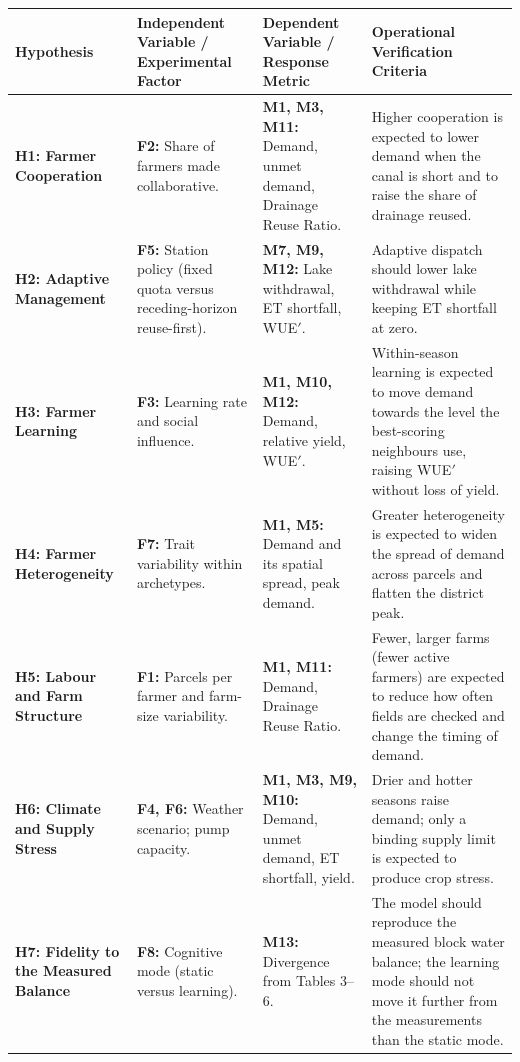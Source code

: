 \documentclass{article}
\begin{document}
\begin{changed}
\medskip
\centering
\small
{}
\begin{tabular}{|p{2.2cm}|p{4.3cm}|p{4.6cm}|p{6.2cm}|}
    \hline
    \rowcolor[HTML]{F8F319}
    \textbf{Hypothesis} & \textbf{Independent Variable / Experimental Factor} & \textbf{Dependent Variable / Response Metric} & \textbf{Operational Verification Criteria} \\ \hline
    \textbf{H1: Farmer Cooperation} & \textbf{F2:} Share of farmers made collaborative. & \textbf{M1, M3, M11:} Demand, unmet demand, Drainage Reuse Ratio. & Higher cooperation is expected to lower demand when the canal is short and to raise the share of drainage reused. \\ \hline
    \textbf{H2: Adaptive Management} & \textbf{F5:} Station policy (fixed quota versus receding-horizon reuse-first). & \textbf{M7, M9, M12:} Lake withdrawal, ET shortfall, WUE$'$. & Adaptive dispatch should lower lake withdrawal while keeping ET shortfall at zero. \\ \hline
    \textbf{H3: Farmer Learning} & \textbf{F3:} Learning rate and social influence. & \textbf{M1, M10, M12:} Demand, relative yield, WUE$'$. & Within-season learning is expected to move demand towards the level the best-scoring neighbours use, raising WUE$'$ without loss of yield. \\ \hline
    \textbf{H4: Farmer Heterogeneity} & \textbf{F7:} Trait variability within archetypes. & \textbf{M1, M5:} Demand and its spatial spread, peak demand. & Greater heterogeneity is expected to widen the spread of demand across parcels and flatten the district peak. \\ \hline
    \textbf{H5: Labour and Farm Structure} & \textbf{F1:} Parcels per farmer and farm-size variability. & \textbf{M1, M11:} Demand, Drainage Reuse Ratio. & Fewer, larger farms (fewer active farmers) are expected to reduce how often fields are checked and change the timing of demand. \\ \hline
    \textbf{H6: Climate and Supply Stress} & \textbf{F4, F6:} Weather scenario; pump capacity. & \textbf{M1, M3, M9, M10:} Demand, unmet demand, ET shortfall, yield. & Drier and hotter seasons raise demand; only a binding supply limit is expected to produce crop stress. \\ \hline
    \textbf{H7: Fidelity to the Measured Balance} & \textbf{F8:} Cognitive mode (static versus learning). & \textbf{M13:} Divergence from \cite{Okura2025WaterBalance} Tables 3--6. & The model should reproduce the measured block water balance; the learning mode should not move it further from the measurements than the static mode. \\ \hline

\end{tabular}
\end{changed}
\end{document}
